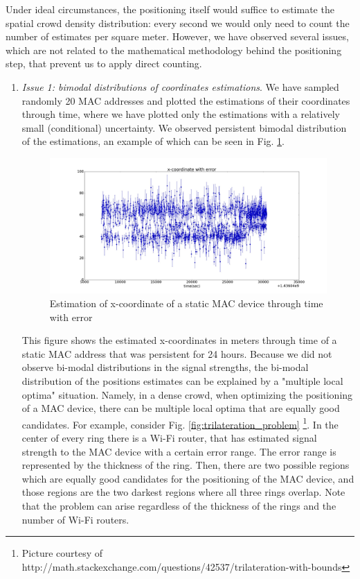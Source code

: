 \documentclass[10pt,a4paper]{article}
\begin{document}
Under ideal circumstances, the positioning itself would suffice to estimate the spatial crowd density distribution:  every second we would only need to count the number of estimates per square meter. However, we have observed several issues, which are not related to the mathematical methodology behind the positioning step, that prevent us to apply direct counting. 
\begin{enumerate}
	\item
	{\it Issue 1: bimodal distributions of coordinates estimations}. We have sampled randomly 20 MAC addresses and plotted the estimations of their coordinates through time, where we have plotted only the estimations with a relatively small (conditional) uncertainty. We observed persistent bimodal distribution of the estimations, an example of which can be seen in Fig. \ref{fig:bimodal}. 
		\begin{figure}[h!]
			\centering
			\includegraphics[width=120mm]{bimodal.jpg}
			\caption{Estimation of x-coordinate of a static MAC device through time with error}
			\label{fig:bimodal}
		\end{figure} 
	This figure shows the estimated x-coordinates in meters through time of a static MAC address that was persistent for 24 hours. Because we did not observe  bi-modal distributions in the signal strengths, the bi-modal distribution of the positions estimates can be explained by a "multiple local optima" situation. Namely, in a dense crowd, when optimizing the positioning of a MAC device, there can be multiple local optima that are equally good candidates. For example, consider Fig. \ref{fig:trilateration_problem} \footnote{Picture courtesy of http://math.stackexchange.com/questions/42537/trilateration-with-bounds}. In the center of every ring there is a Wi-Fi router, that has estimated signal strength to the MAC device with a certain error range. The error range is represented by the thickness of the ring. Then, there are two possible regions which are equally good candidates for the positioning of the MAC device, and those regions are the two darkest regions where all three rings overlap. Note that the problem can arise regardless of the thickness of the rings and the number of Wi-Fi routers. 	

\end{enumerate}
\end{document}
